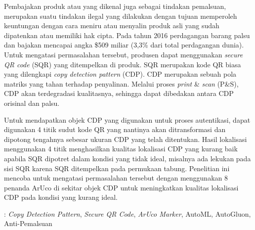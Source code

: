 Pembajakan produk atau yang dikenal juga sebagai tindakan pemalsuan, merupakan suatu tindakan ilegal yang dilakukan dengan tujuan memperoleh keuntungan dengan
cara meniru atau menyalin produk asli yang sudah dipatenkan atau memiliki hak cipta. Pada tahun 2016 perdagangan barang palsu dan bajakan mencapai angka \$509
miliar (3,3\% dari total perdagangan dunia). Untuk mengatasi permasalahan tersebut, produsen dapat menggunakan \emph{secure QR code} (SQR) yang ditempelkan di
produk. SQR merupakan kode QR biasa yang dilengkapi \emph{copy detection pattern} (CDP). CDP merupakan sebuah pola matriks yang tahan terhadap penyalinan.
Melalui proses \emph{print} \& \emph{scan} (P\&S), CDP akan terdegradasi kualitasnya, sehingga dapat dibedakan antara CDP orisinal dan palsu. 

Untuk mendapatkan objek CDP yang digunakan untuk proses autentikasi, dapat digunakan 4 titik sudut kode QR yang nantinya akan ditransformasi dan dipotong tengahnya sebesar ukuran CDP yang telah ditentukan. Hasil lokalisasi menggunakan 4 titik menghasilkan kualitas lokalisasi CDP yang kurang baik apabila SQR dipotret dalam kondisi yang tidak ideal, misalnya ada lekukan pada sisi SQR karena SQR ditempelkan pada permukaan tabung. Penelitian ini mencoba untuk mengatasi permasalahan tersebut dengan menggunakan 8 penanda ArUco di sekitar objek CDP untuk meningkatkan kualitas lokalisasi CDP pada kondisi yang kurang ideal.



 : \emph{Copy Detection Pattern}, \emph{Secure QR Code}, \emph{ArUco Marker}, AutoML, AutoGluon, Anti-Pemalsuan